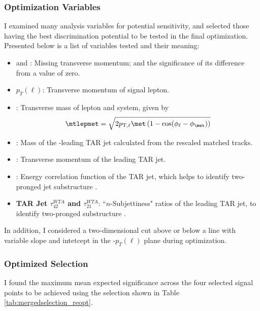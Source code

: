 \subsubsection{Optimization Variables}
I examined many analysis variables for potential sensitivity, and selected those having the best discrimination potential to be tested in the final optimization. Presented below is a list of variables tested and their meaning:

\begin{itemize}
  \item \textbf{\met} and \metsig: Missing transverse momentum; and the significance of its difference from a value of zero.
  \item \textbf{$p_T(\ell)$}: Transverse momentum of signal lepton.
  \item \textbf{\mtlepmet}: Transverse mass of lepton and \met system, given by
  \begin{equation}
  \mtlepmet = \sqrt{2 p_{\text{T},\ell} \met \left( 1 - \cos(\phi_\ell - \phi_{\met}) \right) }
  \end{equation}
  \item \textbf{\mTAR}: Mass of the \pT-leading TAR jet calculated from the rescaled matched tracks.
  \item \textbf{\ptTAR}: Transverse momentum of the leading TAR jet.
  \item \textbf{\DtwoTAR}: Energy correlation function of the TAR jet, which helps to identify two-pronged jet substructure \cite{DTwo}.
  \item \textbf{TAR Jet $\tau_{42}^{WTA}$ and $\tau_{21}^{WTA}$}: ``$n$-Subjettiness" ratios of the leading TAR jet, to identify two-pronged substructure \cite{Tau42}.
\end{itemize}

In addition, I considered a two-dimensional cut above or below a line with variable slope and intetcept in the \met-$p_T(\ell)$ plane during optimization.

\subsubsection{Optimized Selection}

I found the maximum mean expected significance across the four selected signal points to be achieved using the selection shown in Table \ref{tab:mergedselection_reopt}.


